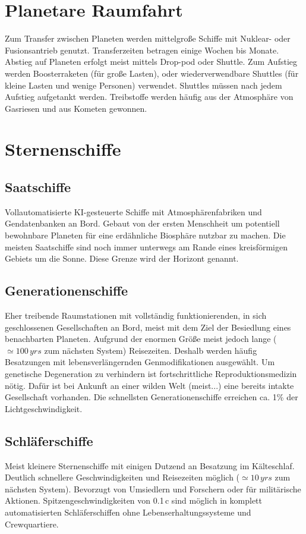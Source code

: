 \documentclass[10pt,a4paper]{report}
\begin{document}
\section{Planetare Raumfahrt}
Zum Transfer zwischen Planeten werden mittelgroße Schiffe mit Nuklear- oder Fusionsantrieb genutzt. Transferzeiten betragen einige Wochen bis Monate. Abstieg auf Planeten erfolgt meist mittels Drop-pod oder Shuttle. Zum Aufstieg werden Boosterraketen (für große Lasten), oder wiederverwendbare Shuttles (für kleine Lasten und wenige Personen) verwendet. Shuttles müssen nach jedem Aufstieg aufgetankt werden. Treibstoffe werden häufig aus der Atmosphäre von Gasriesen und aus Kometen gewonnen.

\section{Sternenschiffe}
\subsection*{Saatschiffe}
Vollautomatisierte KI-gesteuerte Schiffe mit Atmo\-sphären\-fabriken und Gendatenbanken an Bord. Gebaut von der ersten Menschheit um potentiell bewohnbare Planeten für eine erdähnliche Biosphäre nutzbar zu machen. Die meisten Saatschiffe sind noch immer unterwegs am Rande eines kreisförmigen Gebiets um die Sonne. Diese Grenze wird der Horizont genannt.
\subsection*{Generationenschiffe}
Eher treibende Raumstationen mit vollständig funktionierenden, in sich geschlossenen Gesellschaften an Bord, meist mit dem Ziel der Besiedlung eines benachbarten Planeten. Aufgrund der enormen Größe meist jedoch lange ($\simeq 100\, yrs$ zum nächsten System) Reisezeiten. Deshalb werden häufig Besatzungen mit lebens\-verlän\-gernden Genmodifikationen ausgewählt. Um genetische Degeneration zu verhindern ist fortschrittliche Reproduktionsmedizin nötig. Dafür ist bei Ankunft an einer wilden Welt (meist...) eine bereits intakte Gesellschaft vorhanden. Die schnellsten Generationenschiffe erreichen ca. 1\% der Lichtgeschwindigkeit.
\subsection*{Schläferschiffe}
Meist kleinere Sternenschiffe mit einigen Dutzend an Besatzung im Kälteschlaf. Deutlich schnellere Geschwin\-digkeiten und Reisezeiten möglich ($\simeq 10\, yrs$ zum nächsten System). Bevorzugt von Umsiedlern und Forschern oder für militärische Aktionen. Spitzengeschwindigkeiten von 0.1\,c sind möglich in komplett automatisierten Schläferschiffen ohne Lebenserhaltungssysteme und Crewquartiere.
\end{document}

